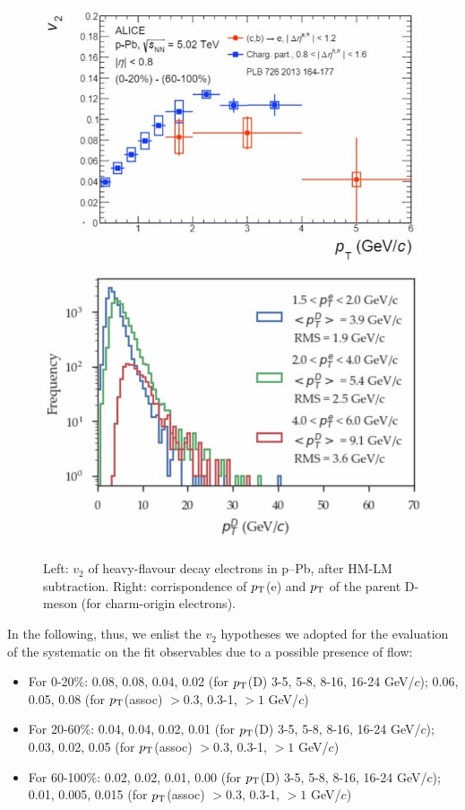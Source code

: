 \begin{figure}
\centering
{\includegraphics[width=0.4\linewidth]{figuresVsCent/Global/v2/v2D1.jpg}}
{\includegraphics[width=0.4\linewidth]{figuresVsCent/Global/v2/v2D2.jpg}}
 \caption{Left: $v_2$ of heavy-flavour decay electrons in p--Pb, after HM-LM subtraction. Right: corrispondence of $p_{\rm T}$(e) and $p_{\rm T}$ of the parent D-meson (for charm-origin electrons).}
\label{fig:v2D}
\end{figure}

In the following, thus, we enlist the $v_2$ hypotheses we adopted for the evaluation of the systematic on the fit observables due to a possible presence of flow:
\begin{itemize}
  \item For 0-20\%: 0.08, 0.08, 0.04, 0.02 (for $p_{\rm T}$(D) 3-5, 5-8, 8-16, 16-24 GeV/$c$); 0.06, 0.05, 0.08 (for $p_{\rm T}$(assoc) $>0.3$, 0.3-1, $>1$ GeV/$c$)
  \item For 20-60\%: 0.04, 0.04, 0.02, 0.01 (for $p_{\rm T}$(D) 3-5, 5-8, 8-16, 16-24 GeV/$c$); 0.03, 0.02, 0.05 (for $p_{\rm T}$(assoc) $>0.3$, 0.3-1, $>1$ GeV/$c$)
  \item For 60-100\%: 0.02, 0.02, 0.01, 0.00 (for $p_{\rm T}$(D) 3-5, 5-8, 8-16, 16-24 GeV/$c$); 0.01, 0.005, 0.015 (for $p_{\rm T}$(assoc) $>0.3$, 0.3-1, $>1$ GeV/$c$)
\end{itemize}

